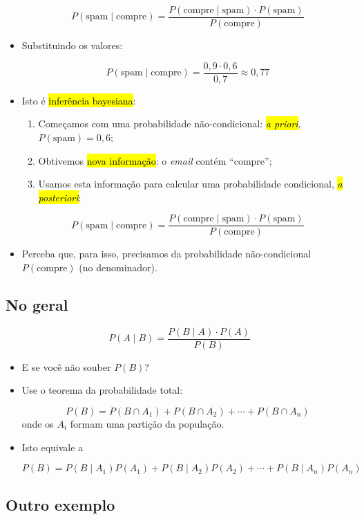 \documentclass[
  11pt]{report}
\begin{document}
\begin{itemize}
  \[
  P(\text{spam} \mid \text{compre}) = \frac{P(\text{compre} \mid \text{spam}) \cdot P(\text{spam})}{P(\text{compre})}
  \]
\item
  Substituindo os valores:

  \[
  P(\text{spam} \mid \text{compre}) = \frac{0{,}9 \cdot 0{,}6}{0{,}7} \approx 0{,}77
  \]
\item
  Isto é {\hl{inferência bayesiana}}:

  \begin{enumerate}
  \def\labelenumi{\arabic{enumi}.}
  \item
    Começamos com uma probabilidade não-condicional: {\hl{\emph{a priori}}}, $P(\text{spam}) = 0{,}6$;
  \item
    Obtivemos {\hl{nova informação}}: o \emph{email} contém ``compre'';
  \item
    Usamos esta informação para calcular uma probabilidade condicional, {\hl{\emph{a posteriori}}}:
  \end{enumerate}

  \[
    P(\text{spam} \mid \text{compre}) = \frac{P(\text{compre} \mid \text{spam}) \cdot P(\text{spam})}{P(\text{compre})}
    \]
\item
  Perceba que, para isso, precisamos da probabilidade não-condicional $P(\text{compre})$ (no denominador).
\end{itemize}

\hypertarget{no-geral}{%
\subsection{No geral}\label{no-geral}}

\[
P(A \mid B) = \frac{P(B \mid A) \cdot P(A)}{P(B)}
\]

\begin{itemize}
\item
  E se você não souber $P(B)$?
\item
  Use o teorema da probabilidade total:

  \[
  P(B) = P(B \cap A_1) + P(B \cap A_2) + \cdots + P(B \cap A_n)
  \]
  onde os $A_i$ formam uma partição da população.
\item
  Isto equivale a

  \[
  P(B) = P(B \mid A_1)P(A_1) + P(B \mid A_2)P(A_2) + \cdots + P(B \mid A_n)P(A_n)
  \]
\end{itemize}

\hypertarget{outro-exemplo}{%
\subsection{Outro exemplo}\label{outro-exemplo}}
\end{document}

